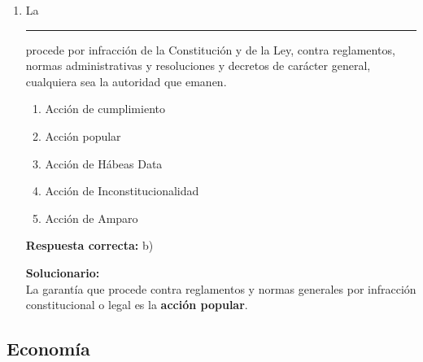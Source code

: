 \begin{enumerate}
	\vspace{2mm}
	\textbf{Solucionario:}\\
	Uno de los fines esenciales de la ONU es \textbf{mantener la paz mundial}.
	
	\vspace{6mm}
	
	\item La \rule{3cm}{0.4pt} procede por infracción de la Constitución y de la Ley, contra reglamentos, normas administrativas y resoluciones y decretos de carácter general, cualquiera sea la autoridad que emanen.
	\begin{enumerate}[label=\alph*)]
		\item Acción de cumplimiento
		\item Acción popular
		\item Acción de Hábeas Data
		\item Acción de Inconstitucionalidad
		\item Acción de Amparo
	\end{enumerate}
	\textbf{Respuesta correcta:} b)
	
	\vspace{2mm}
	\textbf{Solucionario:}\\
	La garantía que procede contra reglamentos y normas generales por infracción constitucional o legal es la \textbf{acción popular}.
	
	\vspace{6mm}
	
\end{enumerate}

\subsection*{Economía}

